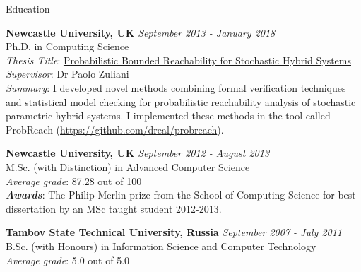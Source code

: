 \documentclass{resume} %
\begin{document}

\begin{rSection}{Education}


{\bf Newcastle University, UK} \hfill {\em September 2013 - January 2018} \\ 
Ph.D. in Computing Science  \\
{\em Thesis Title}: \href{http://hdl.handle.net/10443/4046}{Probabilistic Bounded Reachability for Stochastic Hybrid Systems} \\ 
{\em Supervisor}: Dr Paolo Zuliani \\
{\em Summary}: I developed novel methods combining formal verification techniques
and statistical model checking for probabilistic reachability analysis
of stochastic parametric hybrid systems. 
I implemented these methods in the tool 
called ProbReach (\url{https://github.com/dreal/probreach}).

\smallskip 

{\bf Newcastle University, UK} \hfill {\em September 2012 - August 2013} \\ 
M.Sc. (with Distinction) in Advanced Computer Science \\
{\em Average grade}: 87.28 out of 100 \\
{\bf {\em Awards}}: The Philip Merlin prize from the School of Computing Science 
for best dissertation by an MSc taught student 2012-2013.
\smallskip 

{\bf Tambov State Technical University, Russia} \hfill {\em September 2007 - July 2011} \\ 
B.Sc. (with Honours) in Information Science and Computer Technology \\
{\em Average grade}: 5.0 out of 5.0 \\
\smallskip 
\smallskip

\end{rSection}





\end{document}
